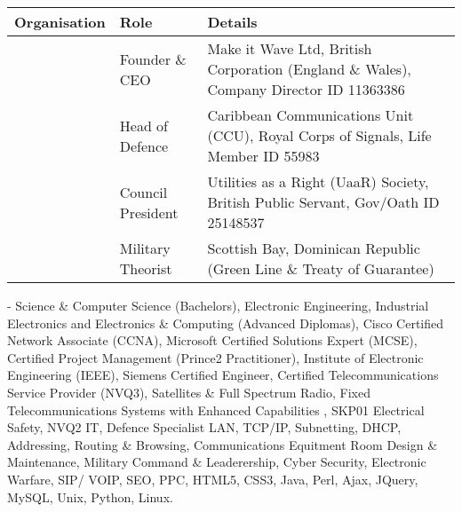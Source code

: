\documentclass[letterpaper,10pt,openany,oneside,english]{sphinxmanual}
\begin{document}
\begin{savenotes}\sphinxattablestart
\centering
\begin{tabulary}{\linewidth}[t]{|T|T|T|}
\hline
\sphinxstyletheadfamily 
Organisation
&\sphinxstyletheadfamily 
Role
&\sphinxstyletheadfamily 
Details
\\
\hline
\noindent{}
&
Founder \& CEO
&
Make it Wave Ltd, British Corporation (England \& Wales), Company Director ID 11363386
\\
\hline
\noindent{}
&
Head of Defence
&
Caribbean Communications Unit (CCU), Royal Corps of Signals, Life Member ID 55983
\\
\hline
\noindent{}
&
Council President
&
Utilities as a Right (UaaR) Society, British Public Servant, Gov/Oath ID 25148537
\\
\hline
\noindent{}
&
Military Theorist
&
Scottish Bay, Dominican Republic (Green Line \& Treaty of Guarantee)
\\
\hline
\end{tabulary}
\par
\sphinxattableend\end{savenotes}

 - Science \& Computer Science (Bachelors), Electronic Engineering, Industrial Electronics and Electronics \& Computing (Advanced Diplomas), Cisco Certified Network Associate (CCNA), Microsoft Certified Solutions Expert (MCSE), Certified Project Management (Prince2 Practitioner), Institute of Electronic Engineering (IEEE), Siemens Certified Engineer, Certified Telecommunications Service Provider (NVQ3), Satellites \& Full Spectrum Radio, Fixed Telecommunications Systems with Enhanced Capabilities , SKP01 Electrical Safety, NVQ2 IT, Defence Specialist LAN, TCP/IP, Subnetting, DHCP, Addressing, Routing \& Browsing, Communications Equitment Room Design \& Maintenance, Military Command \& Leaderership,  Cyber Security, Electronic Warfare, SIP/ VOIP, SEO, PPC, HTML5, CSS3, Java, Perl, Ajax, JQuery, MySQL, Unix, Python, Linux.



\renewcommand{\indexname}{Index}
\printindex
\end{document}
